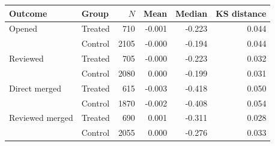 \small
\begin{tabular}{llrrrr}
\toprule
Outcome & Group & $N$ & Mean & Median & KS distance \\
\midrule
Opened & Treated & 710 & -0.001 & -0.223 & 0.044 \\
       & Control & 2105 & -0.000 & -0.194 & 0.044 \\
Reviewed & Treated & 705 & -0.000 & -0.223 & 0.032 \\
         & Control & 2080 & 0.000 & -0.199 & 0.031 \\
Direct merged & Treated & 615 & -0.003 & -0.418 & 0.050 \\
              & Control & 1870 & -0.002 & -0.408 & 0.054 \\
Reviewed merged & Treated & 690 & 0.001 & -0.311 & 0.028 \\
                & Control & 2055 & 0.000 & -0.276 & 0.033 \\
\bottomrule
\end{tabular}
